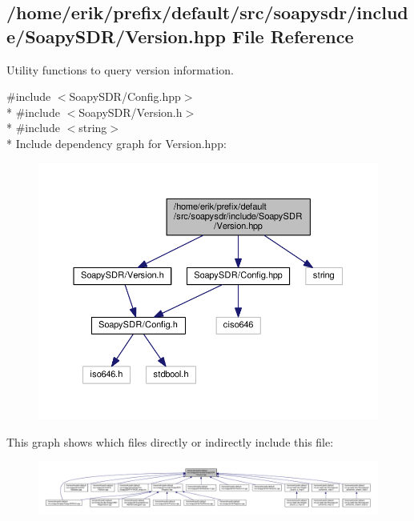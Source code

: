 \subsection{/home/erik/prefix/default/src/soapysdr/include/\+Soapy\+S\+D\+R/\+Version.hpp File Reference}
\label{Version_8hpp}


Utility functions to query version information.  


{\ttfamily \#include $<$Soapy\+S\+D\+R/\+Config.\+hpp$>$}\\*
{\ttfamily \#include $<$Soapy\+S\+D\+R/\+Version.\+h$>$}\\*
{\ttfamily \#include $<$string$>$}\\*
Include dependency graph for Version.\+hpp\+:
\nopagebreak
\begin{figure}[H]
\begin{center}
\leavevmode
\includegraphics[width=350pt]{d1/d0d/Version_8hpp__incl}
\end{center}
\end{figure}
This graph shows which files directly or indirectly include this file\+:
\nopagebreak
\begin{figure}[H]
\begin{center}
\leavevmode
\includegraphics[width=350pt]{d9/d81/Version_8hpp__dep__incl}
\end{center}
\end{figure}
